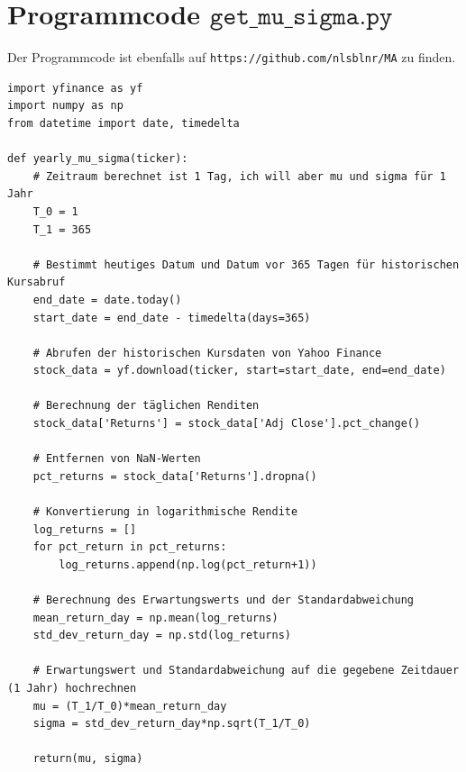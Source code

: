 \documentclass[11pt]{report} %
\begin{document}
\section{Programmcode $\texttt{get\_mu\_sigma.py}$}
Der Programmcode ist ebenfalls auf \texttt{https://github.com/nlsblnr/MA} zu finden.
\label{code:get_mu_sigma.py}
\begin{lstlisting}
import yfinance as yf
import numpy as np
from datetime import date, timedelta

def yearly_mu_sigma(ticker):
    # Zeitraum berechnet ist 1 Tag, ich will aber mu und sigma für 1 Jahr
    T_0 = 1
    T_1 = 365

    # Bestimmt heutiges Datum und Datum vor 365 Tagen für historischen Kursabruf
    end_date = date.today()
    start_date = end_date - timedelta(days=365)

    # Abrufen der historischen Kursdaten von Yahoo Finance
    stock_data = yf.download(ticker, start=start_date, end=end_date)
    
    # Berechnung der täglichen Renditen
    stock_data['Returns'] = stock_data['Adj Close'].pct_change()
    
    # Entfernen von NaN-Werten
    pct_returns = stock_data['Returns'].dropna()
    
    # Konvertierung in logarithmische Rendite
    log_returns = []
    for pct_return in pct_returns:
        log_returns.append(np.log(pct_return+1))
    
    # Berechnung des Erwartungswerts und der Standardabweichung
    mean_return_day = np.mean(log_returns)
    std_dev_return_day = np.std(log_returns)

    # Erwartungswert und Standardabweichung auf die gegebene Zeitdauer (1 Jahr) hochrechnen
    mu = (T_1/T_0)*mean_return_day
    sigma = std_dev_return_day*np.sqrt(T_1/T_0)

    return(mu, sigma)
\end{lstlisting}
\end{document}
